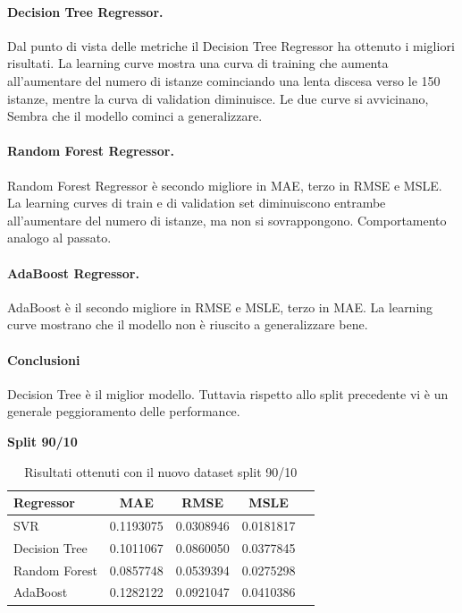 \paragraph{\textbf{Decision Tree Regressor}.}
Dal punto di vista delle metriche il Decision Tree Regressor ha ottenuto i migliori risultati. 
La learning curve mostra una curva di training che aumenta all'aumentare del numero di istanze cominciando una lenta discesa verso le 150 istanze, mentre la curva di validation diminuisce. Le due curve si avvicinano, Sembra che il modello cominci a generalizzare.
\paragraph{\textbf{Random Forest Regressor}.}
Random Forest Regressor è secondo migliore in MAE, terzo in RMSE e MSLE.
La learning curves di train e di validation set diminuiscono entrambe all'aumentare del numero di istanze, ma non si sovrappongono. Comportamento analogo al passato.
\paragraph{\textbf{AdaBoost Regressor}.}
AdaBoost è il secondo migliore in RMSE e MSLE, terzo in MAE.
La learning curve mostrano che il modello non è riuscito a generalizzare bene.


\paragraph{\textbf{Conclusioni}} Decision Tree è il miglior modello. Tuttavia rispetto allo split precedente vi è un generale peggioramento delle performance.

\noindent\textbf{Split 90/10}

\begin{table}[H]
    \centering
    \begin{tabular}{|>{\centering\arraybackslash}m{5cm}|c|c|c|c|}
        \hline
        \textbf{Regressor} & \textbf{MAE} & \textbf{RMSE} & \textbf{MSLE} \\ [10pt]
        \hline
        SVR & 0.1193075 & 0.0308946 & 0.0181817 \\ [10pt]
        \hline
        Decision Tree & 0.1011067 & 0.0860050 & 0.0377845 \\ [10pt]
        \hline
        Random Forest & 0.0857748 & 0.0539394 & 0.0275298 \\ [10pt]
        \hline
        AdaBoost & 0.1282122 & 0.0921047 & 0.0410386 \\ [10pt]
        \hline
    \end{tabular}
    \caption{Risultati ottenuti con il nuovo dataset split 90/10}
    \label{tab:results} 
\end{table}

